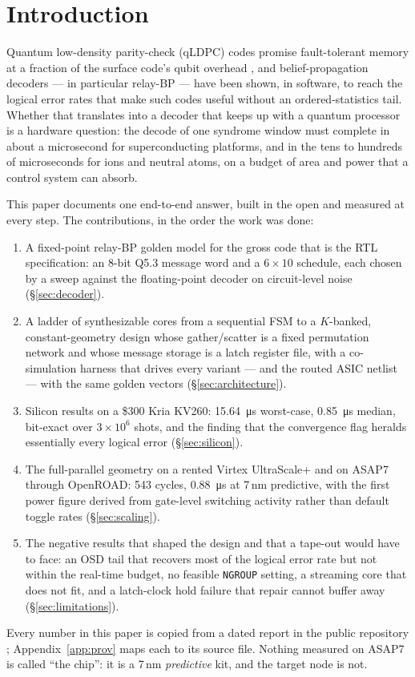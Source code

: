 \section{Introduction}

Quantum low-density parity-check (qLDPC) codes promise fault-tolerant memory at a fraction of the
surface code's qubit overhead \citep{bravyi2024gross}, and belief-propagation decoders --- in
particular relay-BP \citep{muller2025relaybp} --- have been shown, in software, to reach the logical
error rates that make such codes useful without an ordered-statistics tail. Whether that translates
into a decoder that keeps up with a quantum processor is a hardware question: the decode of one
syndrome window must complete in about a microsecond for superconducting platforms, and in the
tens to hundreds of microseconds for ions and neutral atoms, on a budget of area and power that a
control system can absorb.

This paper documents one end-to-end answer, built in the open and measured at every step. The
contributions, in the order the work was done:

\begin{enumerate}
  \item A fixed-point relay-BP golden model for the \gross{} gross code that is the RTL specification:
        an 8-bit Q5.3 message word and a $6\times10$ schedule, each chosen by a sweep against the
        floating-point decoder on circuit-level noise (\S\ref{sec:decoder}).
  \item A ladder of synthesizable cores from a sequential FSM to a $K$-banked, constant-geometry
        design whose gather/scatter is a fixed permutation network and whose message storage is a
        latch register file, with a co-simulation harness that drives every variant --- and the
        routed ASIC netlist --- with the same golden vectors (\S\ref{sec:architecture}).
  \item Silicon results on a \$300 Kria KV260: \SI{15.64}{\micro\second} worst-case,
        \SI{0.85}{\micro\second} median, bit-exact over $3\times10^6$ shots, and the finding that the
        convergence flag heralds essentially every logical error (\S\ref{sec:silicon}).
  \item The full-parallel geometry on a rented Virtex UltraScale+ and on ASAP7 through OpenROAD:
        543 cycles, \SI{0.88}{\micro\second} at 7\,nm predictive, with the first power figure derived
        from gate-level switching activity rather than default toggle rates (\S\ref{sec:scaling}).
  \item The negative results that shaped the design and that a tape-out would have to face: an OSD
        tail that recovers most of the logical error rate but not within the real-time budget, no
        feasible \texttt{NGROUP} setting, a streaming core that does not fit, and a latch-clock hold
        failure that repair cannot buffer away (\S\ref{sec:limitations}).
\end{enumerate}

Every number in this paper is copied from a dated report in the public repository
\citep{alephrepo}; Appendix~\ref{app:prov} maps each to its source file. Nothing measured on ASAP7
is called ``the chip'': it is a 7\,nm \emph{predictive} kit, and the target node is not.
